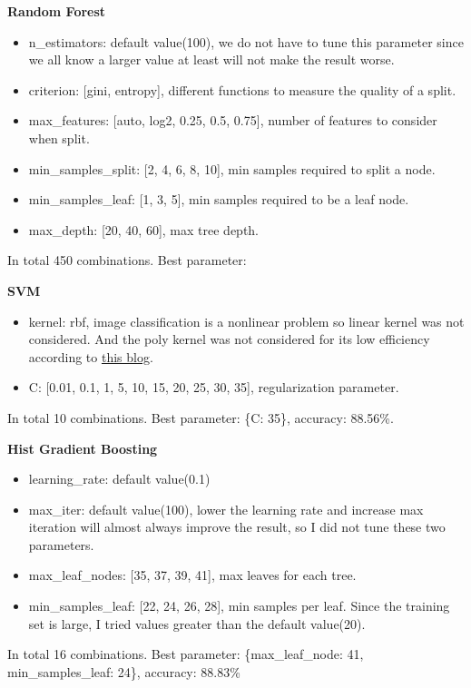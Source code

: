 \documentclass[12pt]{article}
\begin{document}
\textbf{Random Forest}
\begin{itemize}
    \item n\_estimators: default value(100), we do not have to tune this parameter since we all know a larger value at least will not make the result worse.
    \item criterion: [gini, entropy], different functions to measure the quality of a split.
    \item max\_features: [auto, log2, 0.25, 0.5, 0.75], number of features to consider when split.
    \item min\_samples\_split: [2, 4, 6, 8, 10], min samples required to split a node.
    \item min\_samples\_leaf: [1, 3, 5], min samples required to be a leaf node.
    \item max\_depth: [20, 40, 60], max tree depth.
\end{itemize}

In total 450 combinations. Best parameter: 

\textbf{SVM}
\begin{itemize}
    \item kernel: rbf, image classification is a nonlinear problem so linear kernel was not considered. And the poly kernel was not considered for its low efficiency according to \href{https://www.kdnuggets.com/2016/06/select-support-vector-machine-kernels.html}{this blog}.
    \item C: [0.01, 0.1, 1, 5, 10, 15, 20, 25, 30, 35], regularization parameter.
\end{itemize}

In total 10 combinations. Best parameter: \{C: 35\}, accuracy: 88.56\%.

\textbf{Hist Gradient Boosting}
\begin{itemize}
    \item learning\_rate: default value(0.1)
    \item max\_iter: default value(100), lower the learning rate and increase max iteration will almost always improve the result, so I did not tune these two parameters.
    \item max\_leaf\_nodes: [35, 37, 39, 41], max leaves for each tree.
    \item min\_samples\_leaf: [22, 24, 26, 28], min samples per leaf. Since the training set is large, I tried values greater than the default value(20).
\end{itemize}

In total 16 combinations. Best parameter: \{max\_leaf\_node: 41, min\_samples\_leaf: 24\}, accuracy: 88.83\%
\end{document}
